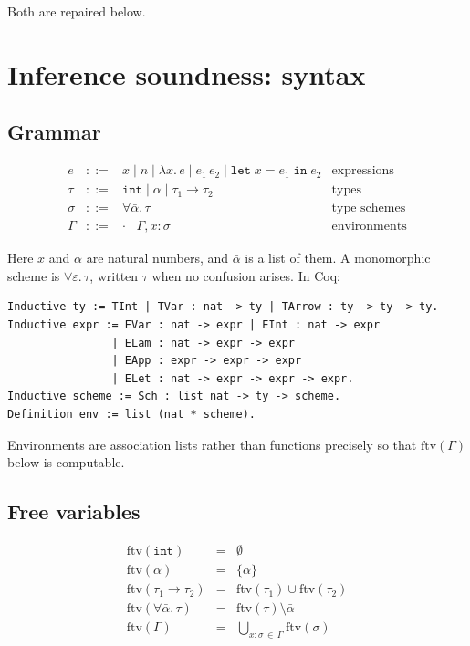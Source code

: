 \documentclass[11pt,a4paper]{article}
\newcommand{\tint}{\mathtt{int}}
\newcommand{\ftv}{\mathrm{ftv}}
\begin{document}
Both are repaired below.

\section{Inference soundness: syntax}
\label{sec:sound-syntax}

\subsection{Grammar}

\[
\begin{array}{lcll}
  e     & ::= & x \mid n \mid \lambda x.\,e \mid e_1\,e_2
                \mid \mathtt{let}\;x = e_1\;\mathtt{in}\;e_2
        & \text{expressions}\\[2pt]
  \tau  & ::= & \tint \mid \alpha \mid \tau_1 \to \tau_2
        & \text{types}\\[2pt]
  \sigma & ::= & \forall \bar\alpha.\,\tau
        & \text{type schemes}\\[2pt]
  \Gamma & ::= & \cdot \mid \Gamma, x{:}\sigma
        & \text{environments}
\end{array}
\]

Here $x$ and $\alpha$ are natural numbers, and $\bar\alpha$ is a list of them.
A monomorphic scheme is $\forall \varepsilon.\,\tau$, written $\tau$ when no
confusion arises.  In Coq:

\begin{lstlisting}
Inductive ty := TInt | TVar : nat -> ty | TArrow : ty -> ty -> ty.
Inductive expr := EVar : nat -> expr | EInt : nat -> expr
                | ELam : nat -> expr -> expr
                | EApp : expr -> expr -> expr
                | ELet : nat -> expr -> expr -> expr.
Inductive scheme := Sch : list nat -> ty -> scheme.
Definition env := list (nat * scheme).
\end{lstlisting}

Environments are association lists rather than functions precisely so that
$\ftv(\Gamma)$ below is computable.

\subsection{Free variables}

\[
\begin{array}{lcl}
  \ftv(\tint) &=& \emptyset \\
  \ftv(\alpha) &=& \{\alpha\} \\
  \ftv(\tau_1 \to \tau_2) &=& \ftv(\tau_1) \cup \ftv(\tau_2) \\[2pt]
  \ftv(\forall\bar\alpha.\,\tau) &=& \ftv(\tau) \setminus \bar\alpha \\
  \ftv(\Gamma) &=& \textstyle\bigcup_{x:\sigma \,\in\, \Gamma} \ftv(\sigma)
\end{array}
\]
\end{document}
